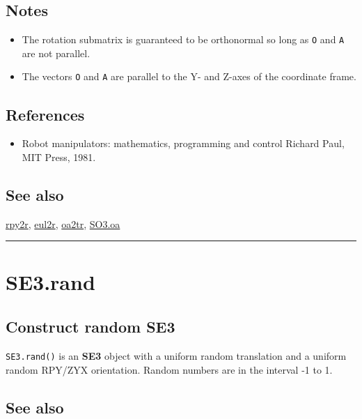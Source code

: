 \subsection*{Notes}
\begin{itemize}
  \item The rotation submatrix is guaranteed to be orthonormal so long as \texttt{O} and \texttt{A}     are not parallel.
  \item The vectors \texttt{O} and \texttt{A} are parallel to the Y- and Z-axes of the coordinate     frame.
\end{itemize}

\subsection*{References}
\begin{itemize}
  \item Robot manipulators: mathematics, programming and control     Richard Paul, MIT Press, 1981.
\end{itemize}

\subsection*{See also}


\hyperlink{rpy2r}{\color{blue} rpy2r}, \hyperlink{eul2r}{\color{blue} eul2r}, \hyperlink{oa2tr}{\color{blue} oa2tr}, \hyperlink{SO3.oa}{\color{blue} SO3.oa}

\vspace{1.5ex}\hrule

\hypertarget{SE3.rand}{\section*{SE3.rand}}
\subsection*{Construct random SE3}


\texttt{SE3.rand()} is an \textbf{\color{red} SE3} object with a uniform random translation and a
uniform random RPY/ZYX orientation.  Random numbers are in the interval -1 to
1.


\subsection*{See also}


